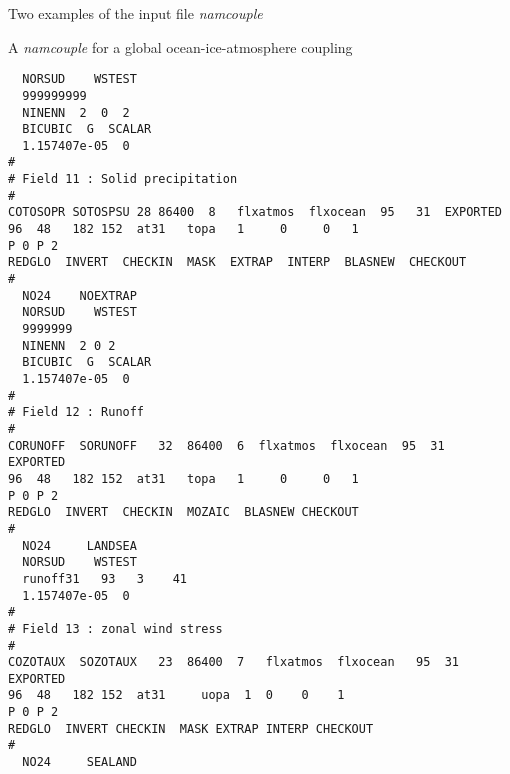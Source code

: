 \begin{section}{Two examples of the input file {\em namcouple}}
\begin{subsection}{A {\em namcouple} for a global ocean-ice-atmosphere coupling}
\begin{verbatim}
  NORSUD    WSTEST                                                        
  999999999                                                       
  NINENN  2  0  2                                                              
  BICUBIC  G  SCALAR                                             
  1.157407e-05  0                                                         
#                                                                       
# Field 11 : Solid precipitation                                        
#                                                                       
COTOSOPR SOTOSPSU 28 86400  8   flxatmos  flxocean  95   31  EXPORTED   
96  48   182 152  at31   topa   1     0     0   1 
P 0 P 2                       
REDGLO  INVERT  CHECKIN  MASK  EXTRAP  INTERP  BLASNEW  CHECKOUT       
#                                                                       
  NO24    NOEXTRAP                                                         
  NORSUD    WSTEST                                                        
  9999999                                                       
  NINENN  2 0 2                                                               
  BICUBIC  G  SCALAR                                             
  1.157407e-05  0                                                         
#                                                                       
# Field 12 : Runoff                                                     
#                                                                       
CORUNOFF  SORUNOFF   32  86400  6  flxatmos  flxocean  95  31  EXPORTED
96  48   182 152  at31   topa   1     0     0   1   
P 0 P 2                     
REDGLO  INVERT  CHECKIN  MOZAIC  BLASNEW CHECKOUT                       
#                                                                       
  NO24     LANDSEA                                                          
  NORSUD    WSTEST                                                        
  runoff31   93   3    41                                                 
  1.157407e-05  0 
#                                                        
# Field 13 : zonal wind stress                                          
#                                                                       
COZOTAUX  SOZOTAUX   23  86400  7   flxatmos  flxocean   95  31  EXPORTED
96  48   182 152  at31     uopa  1  0    0    1  
P 0 P 2                        
REDGLO  INVERT CHECKIN  MASK EXTRAP INTERP CHECKOUT                    
#                                                                       
  NO24     SEALAND                                                          

\end{verbatim}
\end{subsection}
\end{section}
